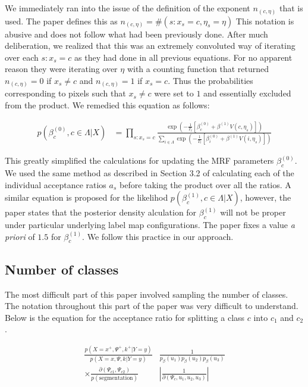 \documentclass[11pt]{article}
\begin{document}
We immediately ran into the issue of the definition of the exponent $n_{(c, \eta)}$ that is used.
The paper defines this as $n_{(c, \eta)}=\#\left(s: x_{s}=c, \eta_{s}=\eta\right)$
This notation is abusive and does not follow what had been previously done.
After much deliberation, we realized that this was an extremely convoluted way of iterating over each $s:x_{s} = c$ as they had done in all previous equations.
For no apparent reason they were iterating over $\eta$ with a counting function that returned $n_{(c, \eta)}=0$ if $x_{s} \neq c$ and $n_{(c, \eta)}=1$ if $x_{s} = c$. Thus the probabilities corresponding to pixels such that $x_{s} \neq c$ were set to $1$ and essentially excluded from the product.
We remedied this equation as follows:

\begin{equation}
\begin{aligned}
p\left(\beta_{c}^{(0)}, c \in \Lambda | X\right) & = \prod_{s:x_{s} = c}\frac{\exp \left(-\frac{1}{T_{t}}\left[\beta_{c}^{(0)}+\beta^{(1)} V(c, \eta_{s})\right]\right)}{\sum_{i \in \Lambda} \exp \left(-\frac{1}{T_{t}}\left[\beta_{i}^{(0)}+\beta^{(1)} V(i, \eta_{s})\right]\right)}
\end{aligned}
\end{equation}

This greatly simplified the calculations for updating the MRF parameters  $\beta_{c}^{(0)}$.
We used the same method as described in Section 3.2 of calculating each of the individual acceptance ratios $a_{s}$ before taking the product over all the ratios.
A similar equation is proposed for the likelihod $p(\beta_{c}^{(1)}, c \in \Lambda | X)$, however, the paper states that the posterior density alculation for $\beta_{c}^{(1)}$ will not be proper under particular underlying label map configurations.
The paper fixes a value \textit{a priori} of $1.5$ for $\beta_{c}^{(1)}$.
We follow this practice in our approach.

\subsection{Number of classes}
The most difficult part of this paper involved sampling the number of classes.
The notation throughout this part of the paper was very difficult to understand.
Below is the equation for the acceptance ratio for splitting a class $c$ into $c_{1}$ and $c_{2}$.

\begin{equation}\label{acc_prob_num_classes}
\begin{aligned}
\frac{p\left(X=x^{+}, \Psi^{+}, k^{+} | Y=y\right)}{p(X=x, \Psi, k | Y=y)} & \frac{1}{p_{\beta}\left(u_{1}\right) p_{\beta}\left(u_{2}\right) p_{\beta}\left(u_{3}\right)} \\
\times \frac{\partial\left(\Psi_{c 1}, \Psi_{c 2}\right)}{p(\text {segmentation})} &\left|\frac{1}{\partial\left(\Psi_{c}, u_{1}, u_{2}, u_{3}\right)}\right|
\end{aligned}
\end{equation}
\end{document}
